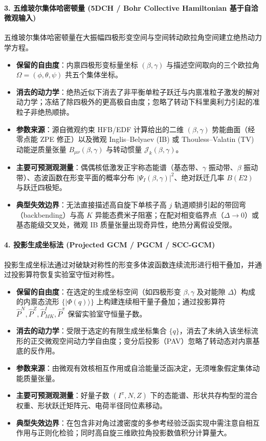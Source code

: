\paragraph{3. 五维玻尔集体哈密顿量 (5DCH / Bohr Collective Hamiltonian 基于自洽微观输入)}
五维玻尔集体哈密顿量在大振幅四极形变空间与空间转动欧拉角空间建立绝热动力学方程。\cite{prochniak-rohozinski-2009-bohr-collective-hamiltonian}
\begin{itemize}
\item \textbf{保留的自由度}：内禀四极形变标量坐标 $(\beta, \gamma)$ 与描述空间取向的三个欧拉角 $\Omega = (\phi, \theta, \psi)$ 共五个集体坐标。
\item \textbf{消去的动力学}：绝热近似下消去了非平衡单粒子跃迁与内禀准粒子激发的解对动力学；冻结了除四极外的更高极自由度；忽略了转动下科里奥利力引起的准粒子非绝热顺排。
\item \textbf{参数来源}：源自微观约束 HFB/EDF 计算给出的二维 $(\beta, \gamma)$ 势能曲面（经零点能 ZPE 修正）以及微观 Inglis--Belyaev (IB) 或 Thouless--Valatin (TV) 动能逆质量张量 $B_{\mu\nu}(\beta, \gamma)$ 与转动惯量 $\mathcal{J}_k(\beta, \gamma)$。
\item \textbf{主要可预测观测量}：偶偶核低激发正宇称态能谱（基态带、$\gamma$ 振动带、$\beta$ 振动带）、态波函数在形变平面的概率分布 $|\Psi_I(\beta, \gamma)|^2$、绝对跃迁几率 $B(E2)$ 与跃迁四极矩。
\item \textbf{典型失效边界}：无法直接描述高自旋下单核子高 $j$ 轨道顺排引起的带回弯（backbending）与高 $K$ 异能态费米子阻塞；在配对相变临界点（$\Delta \to 0$）或基态能级交叉处，微观 IB 质量张量出现奇异性，绝热分离假设受限。
\end{itemize}

\paragraph{4. 投影生成坐标法 (Projected GCM / PGCM / SCC-GCM)}
投影生成坐标法通过对破缺对称性的形变多体波函数连续流形进行相干叠加，并通过投影算符恢复实验室守恒对称性。\cite{Heyde_2011,prochniak-rohozinski-2009-bohr-collective-hamiltonian}
\begin{itemize}
\item \textbf{保留的自由度}：在选定的生成坐标空间（如四极形变 $\beta, \gamma$ 及对能隙 $\Delta$）构成的内禀态流形 $\{|\Phi(q)\rangle\}$ 上构建连续相干量子叠加；通过投影算符 $\hat{P}^N, \hat{P}^Z, \hat{P}^I_{MK}, \hat{P}^\pi$ 保留实验室守恒量子数。
\item \textbf{消去的动力学}：受限于选定的有限生成坐标集合 $\{q\}$，消去了未纳入该坐标流形的正交微观空间动力学自由度；变分后投影（PAV）忽略了转动态对内禀基底的反作用。
\item \textbf{参数来源}：由微观有效核相互作用或自洽能量泛函决定，无须唯象假定集体动能质量张量。
\item \textbf{主要可预测观测量}：好量子数 $(I^\pi, N, Z)$ 下的态能谱、形状共存构型的混合权重、形状跃迁矩阵元、电荷半径同位素移动。
\item \textbf{典型失效边界}：在包含非对角过渡密度的多参考经验泛函实现中需注意自相互作用与正则化检验；同时高自旋三维欧拉角投影数值积分计算量大。
\end{itemize}

